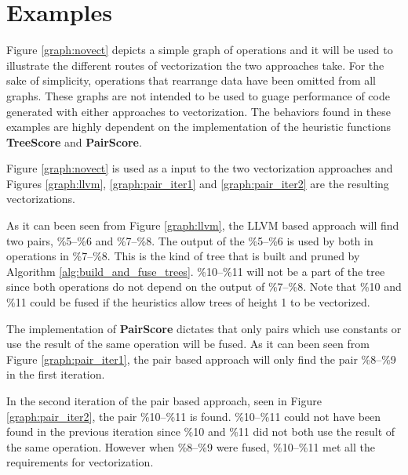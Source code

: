 \documentclass[12pt,a4paper,onecolumn,twoside,openright]{report}
\begin{document}
\section{Examples}
Figure \ref{graph:novect} depicts a simple graph of operations and it will be used to illustrate the different routes of vectorization the two approaches take. For the sake of simplicity, operations that rearrange data have been omitted from all graphs. These graphs are not intended to be used to guage performance of code generated with either approaches to vectorization. The behaviors found in these examples are highly dependent on the implementation of the heuristic functions \textbf{TreeScore} and \textbf{PairScore}.

\begin{center}
\end{center}

Figure \ref{graph:novect} is used as a input to the two vectorization approaches and Figures \ref{graph:llvm}, \ref{graph:pair_iter1} and \ref{graph:pair_iter2} are the resulting vectorizations.

\begin{center}
\end{center}

As it can been seen from Figure \ref{graph:llvm}, the LLVM based approach will find two pairs, \%5--\%6 and \%7--\%8. The output of the \%5--\%6 is used by both in operations in \%7--\%8. This is the kind of tree that is built and pruned by Algorithm \ref{alg:build_and_fuse_trees}. \%10--\%11 will not be a part of the tree since both operations do not depend on the output of \%7--\%8. Note that \%10 and \%11 could be fused if the heuristics allow trees of height 1 to be vectorized.

\begin{center}
\end{center}

The implementation of \textbf{PairScore} dictates that only pairs which use constants or use the result of the same operation will be fused. As it can been seen from Figure \ref{graph:pair_iter1}, the pair based approach will only find the pair \%8--\%9 in the first iteration. 

\begin{center}
\end{center}

In the second iteration of the pair based approach, seen in Figure \ref{graph:pair_iter2}, the pair \%10--\%11 is found. \%10--\%11 could not have been found in the previous iteration since \%10 and \%11 did not both use the result of the same operation. However when \%8--\%9 were fused, \%10--\%11 met all the requirements for vectorization.
\end{document}
